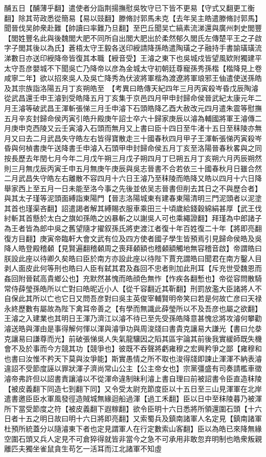 酺五日【酺薄乎翻】遣使者分詣荆揚撫慰吳牧守已下皆不更易【守式又翻更工衡翻】除其苛政悉從簡易【易以豉翻】滕脩討郭馬未克【去年吴主皓遣滕脩討郭馬】聞晉伐吴帥衆赴難【帥讀曰率難乃旦翻】至巴丘聞吴亡縞素流涕還與廣州刺史閭豐【閭姓豐名此與後魏閭大肥不同所自出閭大肥出於柔然郁久閭氏左傳楚平王之子啟字子閭其後以為氏】蒼梧太守王毅各送印綬請降孫皓遣陶璜之子融持手書諭璜璜流涕數日亦送印綬降帝皆復其本職【綬音受】王濬之東下也吳城戍皆望風欵附獨建平太守吾彦嬰城不下聞吳亡乃降帝以彦為金城太守初朝廷尊寵孫秀孫楷【楷降見上卷咸寧二年】欲以招來吳人及吳亡降秀為伏波將軍楷為渡遼將軍琅邪王伷遣使送孫皓及其宗族詣洛陽五月丁亥朔皓至　【考異曰皓傳天紀四年三月丙寅殺岑昏戊辰陶濬從武昌還壬申王濬到受皓降五月丁亥集于京邑四月甲申封歸命侯晉武紀太康元年二月王濬等破武昌王渾斬張悌三月壬申濬下石頭皓降乙酉大赦改元四月遣朱震等慰撫五月辛亥封歸命侯丙寅引皓升殿庚午詔士卒六十歸家庚辰以濬為輔國將軍王濬傳二月庚申克西陵又云壬寅濬入石頭而無月又上書曰臣十四日至牛渚十五日至秣陵亦無月又曰去二月武昌失守皓左右皆得寶散走三十國春秋四月甲子王渾斬張悌丙寅殺岑昏與何楨書庚午送降書壬申濬入石頭甲申封歸命侯五月丁亥至洛陽晉春秋畧與之同按長歷去年閏七月今年二月戊午朔三月戊子朔四月丁巳朔五月丁亥朔六月丙辰朔然則三月無戊辰丙寅壬申五月無庚午庚辰與吳志晉書不合若依三十國春秋月日雖合然二月武昌失守皓左右離散不容四月十六日王濬乃至秣陵而皓降又皓以四月十六日降舉家西上至五月一日未能至洛今事之先後並依吴志晉書但削去其日之不與歷合者】與其太子瑾等泥頭面縛詣東陽門【晉志洛陽城東有建春東陽清明三門泥頭者以泥塗其首也瑾渠吝翻】詔遣謁者解其縛賜衣服車乘田三十頃歲給錢穀綿絹甚厚【武王伐紂斬其首懸於太白之旗如孫皓之凶暴斬之以謝吳人可也乘繩證翻】拜瑾為中郎諸子為王者皆為郎中吳之舊望隨才擢叙孫氏將吏渡江者復十年百姓復二十年【將即亮翻復方目翻】庚寅帝臨軒大會文武有位及四方使者國子學生皆預焉引見歸命侯皓及吳降人皓登殿稽顙【見賢遍翻稽顙周之喪拜顙額也稽顙額觸地無容稽音啟】帝謂皓曰朕設此座以待卿久矣皓曰臣於南方亦設此座以待陛下賈充謂皓曰聞君在南方鑿人目剥人面皮此何等刑也皓曰人臣有弑其君及姦回不忠者則加此刑耳【斥充世受魏恩而姦回附晉弑高貴鄉公也】充默然甚愧而皓顔色無怍【怍疾各翻慙也】帝從容問散騎常侍薛瑩孫皓所以亡對曰皓昵近小人【從千容翻近其靳翻】刑罰放濫大臣諸將人不自保此其所以亡也它日又問吾彦對曰吳主英俊宰輔賢明帝笑曰若是何故亡彦曰天禄永終歷數有屬故為陛下禽耳帝善之【有學而無識此薛瑩所以不及吾彦也屬之欲翻】王濬之入建業也其明日王渾乃濟江以濬不待已至先受孫皓降意甚愧忿將攻濬何攀勸濬送皓與渾由是事得解何惲以渾與濬爭功與周浚牋曰書貴克讓易大謙光【書曰允㳟克讓易曰謙尊而光】前破張悌吳人失氣龍驤因之䧟其區宇論其前後我實緩師既失機會不及於事而今方競其功【競爭也】彼既不吞聲將虧雍穆之宏興矜爭之鄙【雍穆和也書曰汝惟不矜天下莫與汝爭能】斯實愚情之所不取也浚得牋即諫止渾渾不納表濬違詔不受節度誣以罪狀渾子濟尚常山公主【公主帝女也】宗黨彊盛有司奏請檻車徵濬帝弗許但以詔書責讓濬以不從渾命違制昧利濬上書自理曰前被詔書令臣直造秣陵【被皮義翻下同造七到翻下同】又令受太尉充節度臣以十五日至三山見渾軍在北岸遣書邀臣臣水軍風發徑造賊城無緣迴船過渾【過工禾翻】臣以日中至秣陵暮乃被渾所下當受節度之符【被皮義翻下遐稼翻】欲令臣明十六日悉將所領還圍石頭【十六日者十五之明日故曰明十六日將即亮翻】又索蜀兵及鎮南諸軍人名定見【鎮南諸軍杜預所統蓋分以隨濬東下者也定見謂軍人在行定數索山客翻】臣以為皓已來降無緣空圍石頭又兵人定見不可倉猝得就皆非當今之急不可承用非敢忽弃明制也皓衆叛親離匹夫獨坐雀鼠貪生苟乞一活耳而江北諸軍不知虛